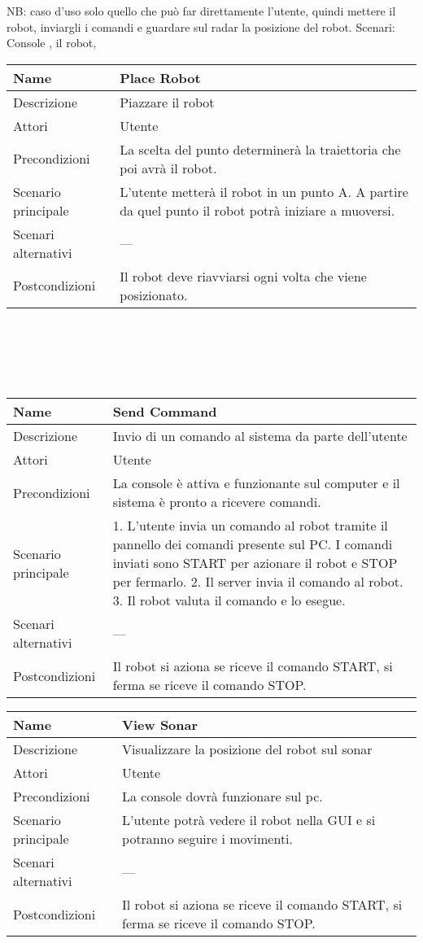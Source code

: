 \documentclass[a4paper]{article}
\begin{document}
NB: caso d’uso solo quello che può far direttamente l’utente, quindi mettere il robot, inviargli i comandi e guardare sul radar la posizione del robot. 
Scenari: Console , il robot,
\\
\begin{tabular}{ | m{5cm} | m{5cm}| }
	Name&Place Robot\\ 
\hline	
	Descrizione&Piazzare il robot\\
\hline	
	Attori&Utente\\
\hline	
	Precondizioni&La scelta del punto determinerà la traiettoria che poi avrà il robot.\\
\hline	
Scenario principale&L’utente metterà il robot in un punto A. A partire da quel punto il robot potrà iniziare a muoversi.\\
\hline	
Scenari alternativi&---\\
\hline	
Postcondizioni&Il robot deve riavviarsi ogni volta che viene posizionato.\\
\end{tabular}
\\
\\
\\
\\

\begin{tabular}{ | m{5cm} | m{5cm}| }
	Name&Send Command\\ 
	\hline	
	Descrizione&Invio di un comando al sistema da parte dell’utente\\
	\hline	
	Attori&Utente\\
	\hline	
	Precondizioni&La console è attiva e funzionante sul computer e il sistema è pronto a ricevere comandi.\\
	\hline	
	Scenario principale&1. L’utente invia un comando al robot tramite il pannello dei comandi presente sul PC. I comandi inviati sono START per azionare il robot e STOP per fermarlo.
	2. Il server invia il comando al robot.
	3. Il robot valuta il comando e lo esegue.\\
	\hline	
	Scenari alternativi&---\\
	\hline	
	Postcondizioni&Il robot si aziona se riceve il comando START, si ferma se riceve il comando STOP.\\
\end{tabular}


\begin{tabular}{ | m{5cm} | m{5cm}| }
	Name&View Sonar\\ 
	\hline	
	Descrizione&Visualizzare la posizione del robot sul sonar\\
	\hline	
	Attori&Utente\\
	\hline	
	Precondizioni&La console dovrà funzionare sul pc.\\
	\hline	
	Scenario principale&L’utente potrà vedere il robot nella GUI e si potranno seguire i movimenti.\\
	\hline	
	Scenari alternativi&---\\
	\hline	
	Postcondizioni&Il robot si aziona se riceve il comando START, si ferma se riceve il comando STOP.\\
\end{tabular}
\end{document}
